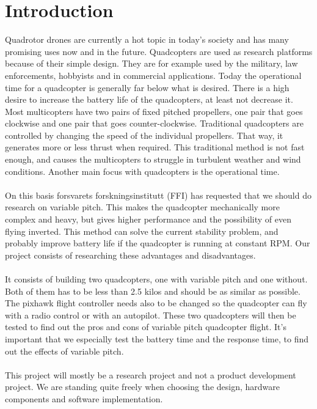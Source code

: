 \section{Introduction}

Quadrotor drones are  currently a hot topic in today’s society and has many promising uses now and in the future. Quadcopters are used as research platforms because of their simple design. They are for example used by the military, law enforcements, hobbyists and in commercial applications. Today the operational time for a quadcopter is generally far below what is desired. There is a high desire to increase the battery life of the quadcopters, at least not decrease it. Most multicopters have two pairs of fixed pitched propellers, one pair that goes clockwise and one pair that goes counter-clockwise. Traditional quadcopters are controlled by changing the speed of the individual propellers. That way, it generates more or less thrust when required. This traditional method is not fast enough, and causes the multicopters to struggle in turbulent weather and wind conditions. Another main focus with quadcopters is the operational time. \\
\\
On this basis forsvarets forskningsinstitutt (FFI) has requested that we should do research on variable pitch. This makes the quadcopter mechanically more complex and heavy, but gives higher performance and the possibility of even flying inverted. This method can solve the current stability problem, and probably improve battery life if the quadcopter is running at constant RPM. Our project consists of researching these advantages and disadvantages. \\
\\
It consists of building two quadcopters, one with variable pitch and one without. Both of them has to be less than 2.5 kilos and should be as similar as possible. The pixhawk flight controller needs also to be changed so the quadcopter can fly with a radio control or with an autopilot. These two quadcopters will then be tested to find out the pros and cons of variable pitch quadcopter flight. It’s important that we especially test the battery time and the response time, to find out the effects of variable pitch.\\
\\
This project will mostly be a research project and not a product development project. We are standing quite freely when choosing the design, hardware components and software implementation.
